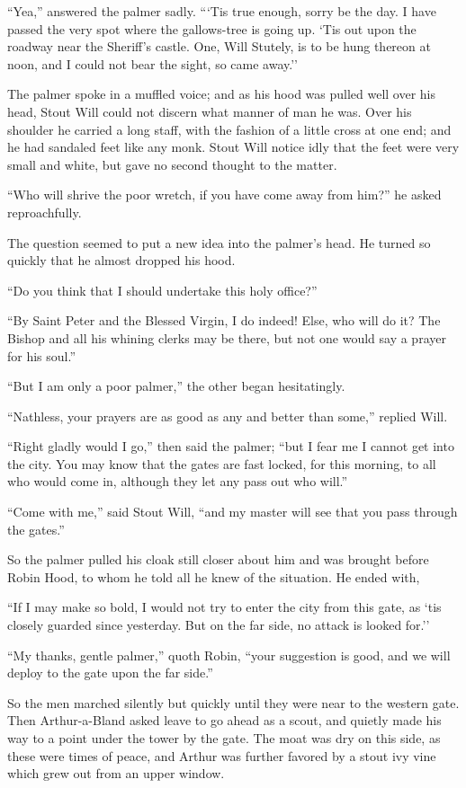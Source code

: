 ``Yea,'' answered the palmer sadly. ```Tis true enough, sorry be the
day. I have passed the very spot where the gallows-tree is going up.
`Tis out upon the roadway near the Sheriff's castle. One, Will Stutely,
is to be hung thereon at noon, and I could not bear the sight, so came
away.''

The palmer spoke in a muffled voice; and as his hood was pulled well
over his head, Stout Will could not discern what manner of man he was.
Over his shoulder he carried a long staff, with the fashion of a little
cross at one end; and he had sandaled feet like any monk. Stout Will
notice idly that the feet were very small and white, but gave no second
thought to the matter.

``Who will shrive the poor wretch, if you have come away from him?'' he
asked reproachfully.

The question seemed to put a new idea into the palmer's head. He turned
so quickly that he almost dropped his hood.

``Do you think that I should undertake this holy office?''

``By Saint Peter and the Blessed Virgin, I do indeed! Else, who will do
it? The Bishop and all his whining clerks may be there, but not one
would say a prayer for his soul.''

``But I am only a poor palmer,'' the other began hesitatingly.

``Nathless, your prayers are as good as any and better than some,''
replied Will.

``Right gladly would I go,'' then said the palmer; ``but I fear me I
cannot get into the city. You may know that the gates are fast locked,
for this morning, to all who would come in, although they let any pass
out who will.''

``Come with me,'' said Stout Will, ``and my master will see that you
pass through the gates.''

So the palmer pulled his cloak still closer about him and was brought
before Robin Hood, to whom he told all he knew of the situation. He
ended with,

``If I may make so bold, I would not try to enter the city from this
gate, as `tis closely guarded since yesterday. But on the far side, no
attack is looked for.''

``My thanks, gentle palmer,'' quoth Robin, ``your suggestion is good,
and we will deploy to the gate upon the far side.''

So the men marched silently but quickly until they were near to the
western gate. Then Arthur-a-Bland asked leave to go ahead as a scout,
and quietly made his way to a point under the tower by the gate. The
moat was dry on this side, as these were times of peace, and Arthur was
further favored by a stout ivy vine which grew out from an upper window.

